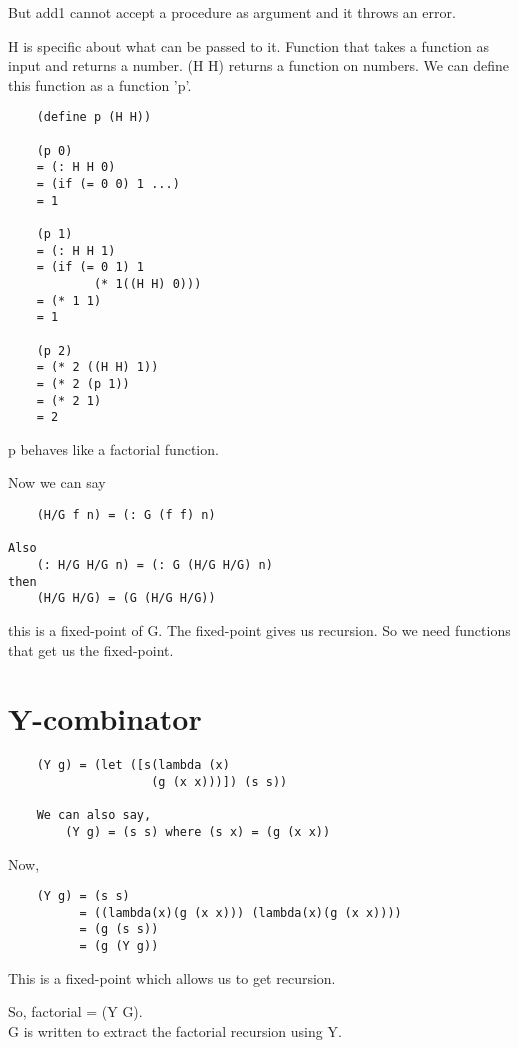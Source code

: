 But add1 cannot accept a procedure as argument and it throws an error.

H is specific about what can be passed to it. Function that takes a function as input and returns a number. (H H) returns a function on numbers.
We can define this function as a function 'p'.

\begin{lstlisting}
    (define p (H H))

    (p 0)
    = (: H H 0)
    = (if (= 0 0) 1 ...)
    = 1

    (p 1)
    = (: H H 1)
    = (if (= 0 1) 1
            (* 1((H H) 0)))
    = (* 1 1)
    = 1

    (p 2)
    = (* 2 ((H H) 1))
    = (* 2 (p 1))
    = (* 2 1)
    = 2
\end{lstlisting}

p behaves like a factorial function.

Now we can say

\begin{lstlisting}
    (H/G f n) = (: G (f f) n)

Also
    (: H/G H/G n) = (: G (H/G H/G) n)
then
    (H/G H/G) = (G (H/G H/G))
\end{lstlisting}

this is a fixed-point of G. The fixed-point gives us recursion. So we need functions that get us the fixed-point.

\section{Y-combinator}

\begin{lstlisting}
    (Y g) = (let ([s(lambda (x)
                    (g (x x)))]) (s s))

    We can also say,
        (Y g) = (s s) where (s x) = (g (x x))
\end{lstlisting}

Now,

\begin{lstlisting}
    (Y g) = (s s)
          = ((lambda(x)(g (x x))) (lambda(x)(g (x x))))
          = (g (s s))
          = (g (Y g))
\end{lstlisting}

This is a fixed-point which allows us to get recursion.

So, factorial = (Y G).
\\ G is written to extract the factorial recursion using Y.

